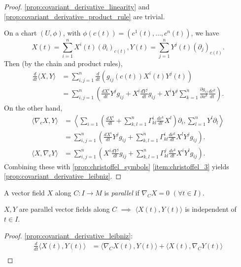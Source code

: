 \begin{proof}
\autoref{prop:covariant_derivative_linearity} and \autoref{prop:covariant_derivative_product_rule} are trivial.

On a chart $(U, \phi)$, with $\phi(c(t)) = (c^1(t), \dots, c^n(t))$, we have
\[
X(t) = \sum_{i=1}^n X^i(t)(\partial_i)_{c(t)}, Y(t) = \sum_{j=1}^n Y^j(t)(\partial_j)_{c(t)}.
\]
Then (by the chain and product rules),
\[
\begin{aligned}
\frac{d}{dt}\langle X, Y \rangle &= \sum_{i,j=1}^n\frac{d}{dt}\left( g_{ij}(c(t))X^i(t)Y^j(t) \right) \\
&= \sum_{i,j=1}^n \left( \frac{dX^i}{dt}Y^jg_{ij} + X^i\frac{dY^j}{dt}g_{ij} + X^iY^j\sum_{k=1}^n \frac{\partial g_{ij}}{\partial x^k}\frac{dc^k}{dt} \right).
\end{aligned}
\]
On the other hand,
\[
\begin{aligned}
\langle \nabla_cX, Y \rangle &= \left\langle \sum_{i=1}\left(\frac{dX^i}{dt} + \sum_{k,l=1}^n \Gamma_{kl}^i\frac{dc^k}{dt}X^l\right)\partial_i, \sum_{l=1}^n Y^l\partial_l \right\rangle \\
&= \sum_{i,j=1}^n \left( \frac{dX^i}{dt}Y^jg_{ij} + \sum_{k,l=1}^n \Gamma_{kl}^i\frac{dc^k}{dt}X^lY^jg_{ij} \right). \\
\langle X, \nabla_cY \rangle &= \sum_{i,j=1}^n \left( X^i\frac{dY^j}{dt}g_{ij} + \sum_{k,l=1}^n \Gamma_{kl}^j\frac{dc^k}{dt}X^iY^lg_{ij} \right).
\end{aligned}
\]
Combining these with \autoref{prop:christoffel_symbols} \autoref{item:christoffel_3} yields \autoref{prop:covariant_derivative_leibniz}.
\end{proof}

\begin{definition}
    A vector field $X$ along $C:I \to M$ is \emph{parallel} if $\nabla_C X = 0$ $(\forall t \in I)$.
\end{definition}

\begin{lemma}
    $X,Y$ are parallel vector fields along $C$ $\implies$ $\langle X(t), Y(t) \rangle$ is independent of $t \in I$.
    \label{lemma:parallel_vector_fields_inner_product_constant}
\end{lemma}
\begin{proof}
\autoref{prop:covariant_derivative_leibniz}:
\[
\begin{aligned}
\frac{d}{dt} \langle X(t), Y(t) \rangle &= \langle \nabla_C X(t), Y(t) \rangle + \langle X(t), \nabla_C Y(t) \rangle \\
\end{aligned}
\]
\end{proof}

